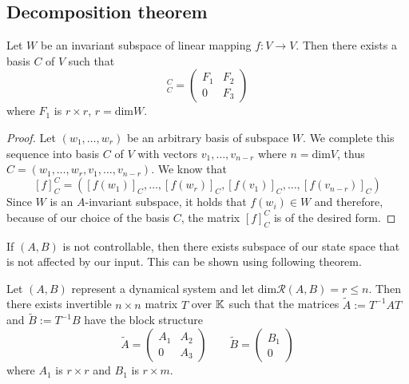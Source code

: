 \subsection{Decomposition theorem}

\begin{lemma}
	\label{lem:invsubspc}
	Let $W$ be an invariant subspace of linear mapping $f\colon V \rightarrow V$. Then there exists a basis $C$ of $V$ such that 
	\begin{equation*}
		[f]^C_C=
		\begin{pmatrix}
			F_1 & F_2 \\
			0   & F_3 
		\end{pmatrix}
	\end{equation*}
	where $F_1$ is $r\times r$, $r=\text{dim}W$.
\end{lemma}

\begin{proof}
	Let $(w_1,\ldots,w_r)$ be an arbitrary basis of subspace $W$. We complete this sequence into basis $C$ of $V$ with vectors $v_1,\ldots,v_{n-r}$ where $n=\text{dim}V$, thus $C=(w_1,\ldots,w_r,v_1,\ldots,v_{n-r})$. We know that $$[f]^C_C=([f(w_1)]_C,\ldots,[f(w_r)]_C,[f(v_1)]_C,\ldots,[f(v_{n-r})]_C)$$ Since $W$ is an $A$-invariant subspace, it holds that $f(w_i)\in W$ and therefore, because of our choice of the basis $C$, the matrix $[f]^C_C$ is of the desired form.
\end{proof}

If $(A,B)$ is not controllable, then there exists subspace of our state space that is not affected by our input. This can be shown using following theorem.

\begin{theorem}
	\label{theorem:decomp}
	Let $(A,B)$ represent a dynamical system and let $\text{dim}\mathcal{R}(A,B)=r\leq n$. Then there exists invertible $n\times n$ matrix $T$ over $\mathbb{K}$ such that the matrices $\widetilde{A}:=T^{-1}AT$ and $\widetilde{B}:=T^{-1}B$ have the block structure 
	\begin{equation}
		\label{eq:decomp}
		\widetilde{A}=
		\begin{pmatrix}
			A_1 & A_2 \\
			0   & A_3 
		\end{pmatrix}
		\qquad
		\widetilde{B}=
		\begin{pmatrix}
			B_1  \\
			0
		\end{pmatrix}
	\end{equation}
	where $A_1$ is $r \times r$ and $B_1$ is $r \times m$.
\end{theorem}


